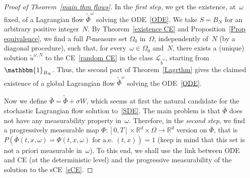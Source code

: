 \documentclass[a4paper,10pt]{article}
\newcommand\1{\mathbbm{1}}
\newcommand{\mr}{\mathbb{R}}
\newcommand{\mc}{\mathcal}
\newcommand{\td}{\tilde}
\numberwithin{equation}{section}
\begin{document}
\begin{proof}[Proof of Theorem~\ref{main thm flows}]
In the \emph{first step}, we get the existence, at~$\omega$ fixed, of a Lagrangian flow $\td{\bar{\Phi}}^\omega$ solving the ODE~\eqref{ODE}. We take $S=B_N$ for an arbitrary positive integer~$N$. By Theorem~\ref{existence CE} and Proposition~\ref{Prop equivalence}, we find a full $P$-measure set $\Omega_0$ in~$\Omega$, independently of~$N$ (by a diagonal procedure), such that, for every~$\omega \in \Omega_0$ and~$N$, there exists a (unique) solution $\td{u}^{\omega,N}$ to the CE~\eqref{random CE} in the class $\mc{L}_{\td{b}^\omega}$, starting from $ \1_{B_N}$. Thus, the second part of Theorem~\ref{Lagrthm} gives the claimed existence of a global Lagrangian flow $\td{\bar{\Phi}}^\omega$ solving the ODE~\eqref{ODE}.

Now we define $\bar{\Phi}=\td{\bar{\Phi}}+\sigma W$, which seems at first the natural candidate for the stochastic Lagrangian flow solution to~\eqref{SDE}. The main problem is that $\bar{\Phi}$ does not have any measurability property in~$\omega$. Therefore, in the \emph{second step}, we find a progressively measurable map $\Phi \colon [0,T]\times\mr^d\times\Omega\rightarrow \mr^d$ version on $\bar{\Phi}$, that is $P(\bar{\Phi}(t,x,\omega)=\Phi(t,x,\omega)\text{ for a.e. }(t,x))=1$ (keep in mind that this set is not a priori measurable in~$\omega$). To this end, we shall use the link between ODE and CE (at the deterministic level) and the progressive measurability of the solution to the sCE~\eqref{sCE}.


\end{proof}
\end{document}
